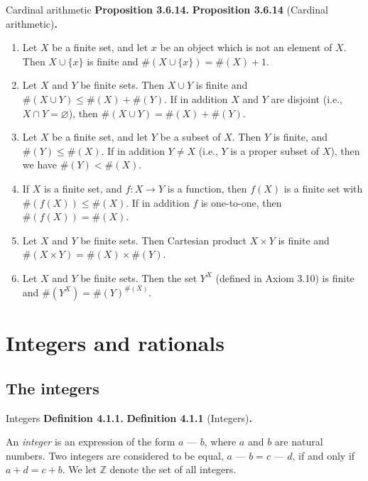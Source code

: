 \documentclass[12pt]{article}
\newcommand{\minus}{\textrm{ --- }}
\newenvironment{df}[2][\relax]{
\vspace{4mm}
    \noindent\setlength{\parskip}{1em}%
    \ifx#1\relax%
        \textbf{#2. }%
    \else%
        \textbf{#2} (#1)\textbf{. }%
    \fi%
    \ignorespaces%
}{}
\theoremstyle{remark}
\begin{document}
\begin{df}[Cardinal arithmetic]{Proposition 3.6.14}
    \begin{enumerate}[topsep=0mm,label=(\alph*)]
        \item Let $X$ be a finite set, and let $x$ be an object which is not an element of $X$.
            Then $X \cup \{ x \}$ is finite and $\#(X \cup \{ x \}) = \#(X) + 1$.
            
        \item  Let $X$ and $Y$ be finite sets.
            Then $X \cup Y$ is finite and $\#(X \cup Y ) \le \#(X) + \#(Y).$
            If in addition $X$ and $Y$ are disjoint (i.e., $X \cap Y = \varnothing$), then $\#(X \cup Y) = \#(X) + \#(Y)$.

        \item Let $X$ be a finite set, and let $Y$ be a subset of $X$.
            Then $Y$ is finite, and $\#(Y) \le \#(X)$.
            If in addition $Y \ne X$ (i.e., $Y$ is a proper subset of $X$), then we have $\#(Y) < \#(X)$.

        \item If $X$ is a finite set, and $f : X \to Y$ is a function, then $f(X)$ is a finite set with $\#(f(X)) \le \#(X)$.
            If in addition $f$ is one-to-one, then $\#(f(X)) = \#(X)$.
        
        \item Let $X$ and $Y$ be finite sets.
            Then Cartesian product $X \times Y$ is finite and $\#(X \times Y) = \#(X) \times \#(Y)$.

        \item Let $X$ and $Y$ be finite sets.
            Then the set $Y^X$ (defined in Axiom 3.10) is finite and $\#(Y^X) = \#(Y)^{\#(X)}$.
    \end{enumerate}
\end{df}


\pagebreak


\section{Integers and rationals}
\subsection{The integers}

\begin{df}[Integers]{Definition 4.1.1}
    An \emph{integer} is an expression of the form $a \minus b$, where $a$ and $b$ are natural numbers.
    Two integers are considered to be equal, $a \minus b = c \minus d$, if and only if $a + d = c + b$.
    We let $\mathbb{Z}$ denote the set of all integers.
\end{df}
\end{document}
